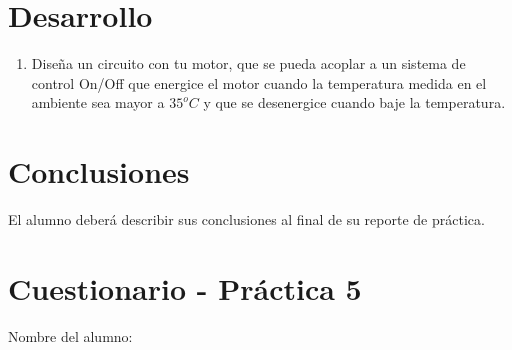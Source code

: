 
\section{Desarrollo}

	\begin{enumerate}
		\item Diseña un circuito con tu motor, que se pueda acoplar a un sistema de control On/Off que energice el motor cuando la temperatura medida en el ambiente sea mayor a $35^o C$ y que se desenergice cuando baje la temperatura.
	\end{enumerate}


\section{Conclusiones}

	El alumno deberá describir sus conclusiones al final de su reporte de práctica.


\clearpage
\section{Cuestionario - Práctica 5}
	Nombre del alumno: \\[0.2cm]
	\horrule{0.5pt} \\[0.2cm] %

